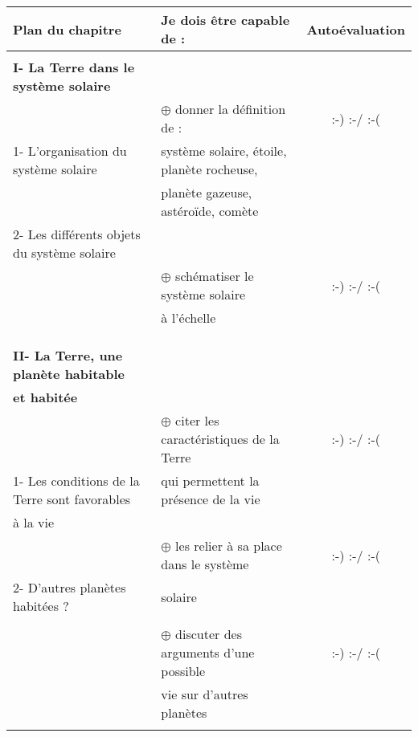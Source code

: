 \documentclass[10.5pt]{article}
\begin{document}
\begin{center}
\begin{tabular}{|*{2}{l|}c|}
\hline
Plan du chapitre & Je dois être capable de : & Autoévaluation \\ \hline
& & \\
\textbf{\large{I- La Terre dans le système solaire}} &  &  \\
& $\oplus$ donner la définition de : & :-)  \quad \quad  :-/ \quad \quad  :-(  \\
1- L'organisation du système solaire & système solaire, étoile, planète rocheuse, & \\
& planète gazeuse, astéroïde, comète & \\
2- Les différents objets du système solaire & & \\
& $\oplus$ schématiser le système solaire & :-)  \quad \quad  :-/ \quad \quad  :-(  \\
& à l'échelle & \\
& & \\
& & \\ \hline 
& & \\
\textbf{\large{II- La Terre, une planète habitable}} & & \\ 
\textbf{\large{et habitée}} & & \\
& $\oplus$ citer les caractéristiques de la Terre & :-)  \quad \quad  :-/ \quad \quad  :-(  \\
1- Les conditions de la Terre sont favorables &  qui permettent la présence de la vie &  \\
à la vie & & \\
& $\oplus$ les relier à sa place dans le système & :-)  \quad \quad  :-/ \quad \quad  :-(  \\ 
2- D'autres planètes habitées ? & solaire & \\
& & \\
& $\oplus$ discuter des arguments d'une possible & :-)  \quad \quad  :-/ \quad \quad  :-(  \\ 
& vie sur d'autres planètes & \\
& & \\ \hline
\end{tabular}
\end{center}



\end{document}
